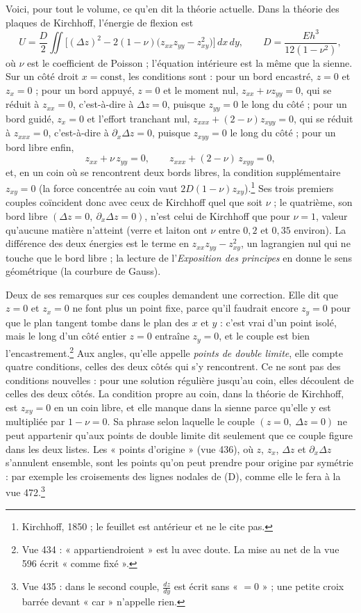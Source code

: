 \documentclass[11pt,a4paper]{article}
\begin{document}
Voici, pour tout le volume, ce qu'en dit la théorie actuelle. Dans la théorie des
plaques de Kirchhoff, l'énergie de flexion est
\[
U = \frac{D}{2}\iint\Big[(\Delta z)^2 - 2(1-\nu)\big(z_{xx}z_{yy} - z_{xy}^2\big)\Big]\,dx\,dy,
\qquad D = \frac{E h^3}{12(1-\nu^2)},
\]
où $\nu$ est le coefficient de Poisson ; l'équation intérieure est la même que la
sienne. Sur un côté droit $x = \text{const}$, les conditions sont : pour un bord
encastré, $z = 0$ et $z_x = 0$ ; pour un bord appuyé, $z = 0$ et le moment nul,
$z_{xx} + \nu z_{yy} = 0$, qui se réduit à $z_{xx} = 0$, c'est-à-dire à $\Delta z = 0$,
puisque $z_{yy} = 0$ le long du côté ; pour un bord guidé, $z_x = 0$ et l'effort
tranchant nul, $z_{xxx} + (2-\nu)z_{xyy} = 0$, qui se réduit à $z_{xxx} = 0$,
c'est-à-dire à $\partial_x\Delta z = 0$, puisque $z_{xyy} = 0$ le long du côté ; pour
un bord libre enfin,
\[
z_{xx} + \nu\,z_{yy} = 0, \qquad z_{xxx} + (2-\nu)\,z_{xyy} = 0,
\]
et, en un coin où se rencontrent deux bords libres, la condition supplémentaire
$z_{xy} = 0$ (la force concentrée au coin vaut $2D(1-\nu)z_{xy}$).\footnote{Kirchhoff,
1850 ; le feuillet est antérieur et ne le cite pas.} Ses trois premiers couples
coïncident donc avec ceux de Kirchhoff quel que soit $\nu$ ; le quatrième, son bord
libre $(\Delta z = 0,\ \partial_x\Delta z = 0)$, n'est celui de Kirchhoff que pour
$\nu = 1$, valeur qu'aucune matière n'atteint (verre et laiton ont $\nu$ entre $0{,}2$
et $0{,}35$ environ). La différence des deux énergies est le terme en
$z_{xx}z_{yy} - z_{xy}^2$, un lagrangien nul qui ne touche que le bord libre ; la
lecture de l'\emph{Exposition des principes} en donne le sens géométrique (la courbure
de Gauss).

Deux de ses remarques sur ces couples demandent une correction. Elle dit que
$z = 0$ et $z_x = 0$ ne font plus un point fixe, parce qu'il faudrait encore
$z_y = 0$ pour que le plan tangent tombe dans le plan des $x$ et $y$ : c'est vrai d'un
point isolé, mais le long d'un côté entier $z = 0$ entraîne $z_y = 0$, et le couple
est bien l'encastrement.\footnote{Vue 434 : « appartiendroient » est lu avec doute. La
mise au net de la vue 596 écrit « comme fixé ».} Aux angles, qu'elle appelle
\emph{points de double limite}, elle compte quatre conditions, celles des deux côtés
qui s'y rencontrent. Ce ne sont pas des conditions nouvelles : pour une solution
régulière jusqu'au coin, elles découlent de celles des deux côtés. La condition
propre au coin, dans la théorie de Kirchhoff, est $z_{xy} = 0$ en un coin libre, et
elle manque dans la sienne parce qu'elle y est multipliée par $1 - \nu = 0$. Sa phrase
selon laquelle le couple $(z = 0,\ \Delta z = 0)$ ne peut appartenir qu'aux points de
double limite dit seulement que ce couple figure dans les deux listes. Les « points
d'origine » (vue 436), où $z$, $z_x$, $\Delta z$ et $\partial_x\Delta z$ s'annulent
ensemble, sont les points qu'on peut prendre pour origine par symétrie : par exemple
les croisements des lignes nodales de (D), comme elle le fera à la vue
472.\footnote{Vue 435 : dans le second couple, $\frac{dz}{dy}$ est écrit sans
« $=0$ » ; une petite croix barrée devant « car » n'appelle rien.}
\end{document}
